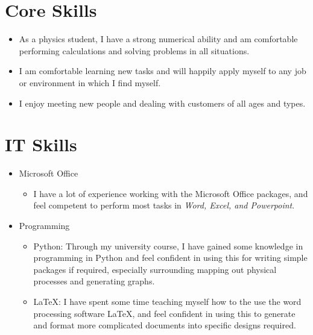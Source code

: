 \documentclass[10pt, a4paper]{article}
\begin{document}
\section{Core Skills}
\begin{itemize}
	\item As a physics student, I have a strong numerical ability and am comfortable performing calculations and solving problems in all situations.
	\item I am comfortable learning new tasks and will happily apply myself to any job or environment in which I find myself.
	\item I enjoy meeting new people and dealing with customers of all ages and types.
\end{itemize}

\section{IT Skills}
\begin{itemize}
	\item Microsoft Office
	\begin{itemize}
		\item I have a lot of experience working with the Microsoft Office packages, and feel competent to perform most tasks in \textit{Word, Excel, and Powerpoint}.
	\end{itemize}
	\item Programming
	\begin{itemize}
		\item Python: Through my university course, I have gained some knowledge in programming in Python and feel confident in using this for writing simple packages if required, especially surrounding mapping out physical processes and generating graphs.
		\item \LaTeX: I have spent some time teaching myself how to the use the word processing software \LaTeX, and feel confident in using this to generate and format more complicated documents into specific designs required.
	\end{itemize}
\end{itemize}

\newpage
\end{document}
